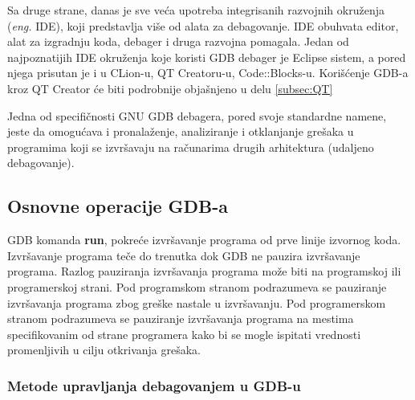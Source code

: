 \documentclass[a4paper]{article}
\begin{document}
Sa druge strane, danas je sve veća upotreba integrisanih razvojnih okruženja (\textit{eng.} IDE),
koji predstavlja više od alata za debagovanje. IDE obuhvata editor, alat za izgradnju koda, debager i druga 
razvojna pomagala. Jedan od najpoznatijih IDE okruženja koje koristi GDB debager je Eclipse sistem,
a pored njega prisutan je i u CLion-u, QT Creatoru-u, Code::Blocks-u\cite{sourceware}.
Korišćenje GDB-a kroz QT Creator će biti podrobnije objašnjeno u delu \ref{subsec:QT}

Jedna od specifičnosti GNU GDB debagera, pored svoje standardne namene, jeste da omogućava i 
pronalaženje, analiziranje i otklanjanje grešaka u programima koji se izvršavaju na računarima drugih 
arhitektura (udaljeno debagovanje). 

\subsection{Osnovne operacije GDB-a}
\label{subsec:debager_operacije}

GDB komanda \textbf{run}, pokreće izvršavanje programa od prve linije izvornog koda.
Izvršavanje programa teče do trenutka dok GDB ne pauzira izvršavanje programa. 
Razlog pauziranja izvršavanja programa može biti na programskoj ili programerskoj strani.
Pod programskom stranom podrazumeva se pauziranje izvršavanja programa zbog greške 
nastale u izvršavanju. Pod programerskom stranom podrazumeva se pauziranje izvršavanja 
programa na mestima specifikovanim od strane programera kako bi se mogle ispitati 
vrednosti promenljivih u cilju otkrivanja grešaka.

\subsubsection{Metode upravljanja debagovanjem u GDB-u}
\label{subsec:gdb_metode}
\end{document}
